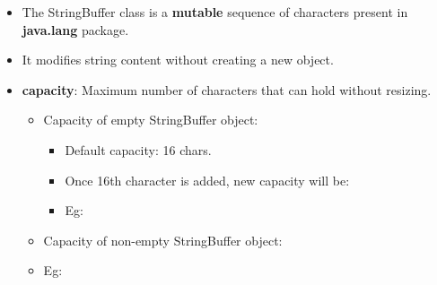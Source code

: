 
\begin{flushleft}
	
	\begin{itemize}
		\item The StringBuffer class is a \textbf{mutable} sequence of characters present in \textbf{java.lang} package. 
		\item It modifies string content without creating a new object. 
		
		\item \textbf{capacity}: Maximum number of characters that can hold without resizing.
		\begin{itemize}
			\item Capacity of empty StringBuffer object:
			\begin{itemize}
				\item Default capacity: 16 chars.
				\item Once 16th character is added, new capacity will be:
				\bigskip
				\item Eg:
				\bigskip
				
			\end{itemize}
			
			
			\item Capacity of non-empty StringBuffer object:
			\bigskip
			\bigskip
			\item Eg:
			\bigskip
			
		\end{itemize}
	\end{itemize}
	
\end{flushleft}

